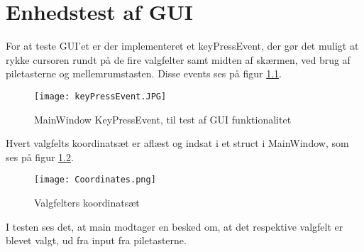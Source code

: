 \chapter{Enhedstest af GUI}
\label{appendix:BilagGUIEnhedstest}
For at teste GUI'et er der implementeret et keyPressEvent, der gør det muligt at rykke cursoren rundt på de fire valgfelter samt midten af skærmen, ved brug af piletasterne og mellemrumstasten. Disse events ses på figur \ref{KeyPressEvents}.

\begin{figure} [H]
	\centering
	\texttt{[image: keyPressEvent.JPG]}
	\caption{MainWindow KeyPressEvent, til test af GUI funktionalitet}
	\label{KeyPressEvents}
\end{figure}

Hvert valgfelts koordinatsæt er aflæst og indsat i et struct i MainWindow, som ses på figur \ref{Coordinates}.

\begin{figure} [H]
	\centering
	\texttt{[image: Coordinates.png]}
	\caption{Valgfelters koordinatsæt}
	\label{Coordinates}
\end{figure}

I testen ses det, at main modtager en besked om, at det respektive valgfelt er blevet valgt, ud fra input fra piletasterne.